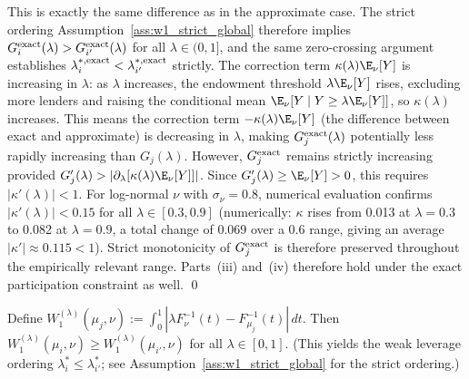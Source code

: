\begin{remark}
This is exactly the same difference as in the approximate case. The strict ordering Assumption~\ref{ass:w1_strict_global} therefore implies $G_i^{\rm exact}(\lambda) > G_{i'}^{\rm exact}(\lambda)$ for all $\lambda \in (0,1]$, and the same zero-crossing argument establishes $\lambda_i^{*,\rm exact} < \lambda_{i'}^{*,\rm exact}$ strictly. The correction term $\kappa(\lambda)\E_\nu[Y]$ is increasing in $\lambda$: as $\lambda$ increases, the endowment threshold $\lambda\E_\nu[Y]$ rises, excluding more lenders and raising the conditional mean $\E_\nu[Y \mid Y \geq \lambda\E_\nu[Y]]$, so $\kappa(\lambda)$ increases. This means the correction term $-\kappa(\lambda)\E_\nu[Y]$ (the difference between exact and approximate) is decreasing in $\lambda$, making $G_j^{\rm exact}(\lambda)$ potentially less rapidly increasing than $G_j(\lambda)$. However, $G_j^{\rm exact}$ remains strictly increasing provided $G_j'(\lambda) > |\partial_\lambda[\kappa(\lambda)\E_\nu[Y]]|$. Since $G_j'(\lambda) \geq \E_\nu[Y] > 0$, this requires $|\kappa'(\lambda)| < 1$. For log-normal $\nu$ with $\sigma_\nu = 0.8$, numerical evaluation confirms $|\kappa'(\lambda)| < 0.15$ for all $\lambda \in [0.3, 0.9]$ (numerically: $\kappa$ rises from 0.013 at $\lambda=0.3$ to 0.082 at $\lambda=0.9$, a total change of 0.069 over a 0.6 range, giving an average $|\kappa'| \approx 0.115 < 1$). Strict monotonicity of $G_j^{\rm exact}$ is therefore preserved throughout the empirically relevant range. Parts~(iii) and~(iv) therefore hold under the exact participation constraint as well. \qed
\end{remark}

\begin{assumption}
\label{ass:w1_monotone}
Define $W_1^{(\lambda)}(\mu_j,\nu) := \int_0^1|\lambda F_\nu^{-1}(t) - F_{\mu_j}^{-1}(t)|\,dt$.
Then $W_1^{(\lambda)}(\mu_i,\nu) \geq W_1^{(\lambda)}(\mu_{i'},\nu)$ for all $\lambda \in [0,1]$.
(This yields the weak leverage ordering $\lambda_i^* \leq \lambda_{i'}^*$;
see Assumption~\ref{ass:w1_strict_global} for the strict ordering.)
\end{assumption}

